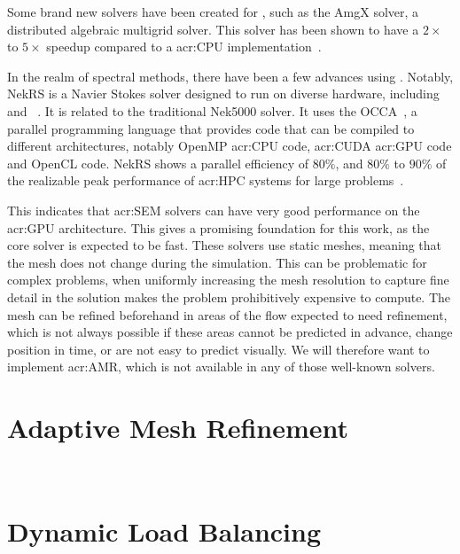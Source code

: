 Some brand new solvers have been created for , such as the AmgX solver, a
distributed algebraic multigrid solver. This solver has been shown to have a \(2 \times \) to \(5
\times \) speedup compared to a \acrshort{acr:CPU} implementation~\cite{Naumov2015}.

In the realm of spectral methods, there have been a few advances using .
Notably, NekRS is a Navier Stokes solver designed to run on diverse hardware, including
 and ~\cite{Fischer2021}. It is related to the traditional
Nek5000 solver. It uses the OCCA~\cite{Medina2014}, a parallel programming language that provides
code that can be compiled to different architectures, notably OpenMP \acrshort{acr:CPU} code,
\acrshort{acr:CUDA} \acrshort{acr:GPU} code and OpenCL code. NekRS shows a parallel efficiency of
\(80 \% \), and \(80 \% \) to \(90 \% \) of the realizable peak performance of \acrshort{acr:HPC}
systems for large problems~\cite{Fischer2021}.

This indicates that \acrshort{acr:SEM} solvers can have very good performance on the
\acrshort{acr:GPU} architecture. This gives a promising foundation for this work, as the core solver
is expected to be fast. These solvers use static meshes, meaning that the mesh does not change
during the simulation. This can be problematic for complex problems, when uniformly increasing the
mesh resolution to capture fine detail in the solution makes the problem prohibitively expensive to
compute. The mesh can be refined beforehand in areas of the flow expected to need refinement, which
is not always possible if these areas cannot be predicted in advance, change position in time, or
are not easy to predict visually. We will therefore want to implement \acrlong{acr:AMR}, which is
not available in any of those well-known solvers.

\section{Adaptive Mesh Refinement}\label{section:literature_review:amr}


~\cite{Schive2018} %

\section{Dynamic Load Balancing}\label{section:literature_review:load_balancing}
